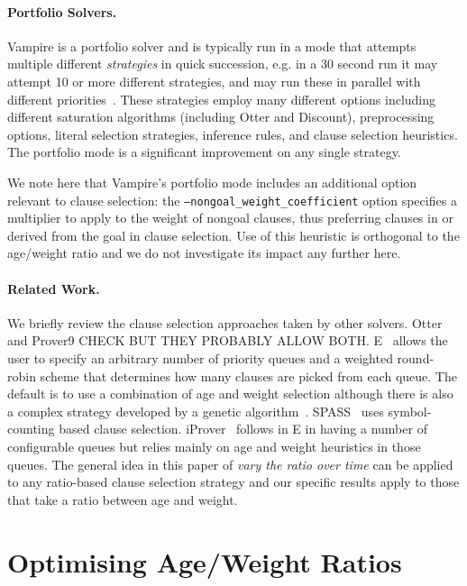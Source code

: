 \documentclass{llncs}
\begin{document}
\paragraph{Portfolio Solvers.}

Vampire is a portfolio solver and is typically run in a mode that attempts multiple different \emph{strategies} in quick succession, e.g. in a 30 second run it may attempt 10 or more different strategies, and may run these in parallel with different priorities~\cite{DBLP:conf/cade/RawsonR18}. These strategies employ many different options including different saturation algorithms (including Otter and Discount), preprocessing options, literal selection strategies, inference rules, and clause selection heuristics. The portfolio mode is a significant improvement on any single strategy. 

We note here that Vampire's portfolio mode includes an additional option relevant to clause selection: the \texttt{--nongoal\_weight\_coefficient} option specifies a multiplier to apply to the weight of nongoal clauses, thus preferring clauses in or derived from the goal in clause selection. Use of this heuristic is orthogonal to the age/weight ratio and we do not investigate its impact any further here.

\paragraph{Related Work.} We briefly review the clause selection approaches taken by other solvers. 
%
Otter \cite{} and Prover9 \cite{} CHECK BUT THEY PROBABLY  ALLOW BOTH.
%
E~\cite{E} allows the user to specify an arbitrary number of priority queues and a weighted round-robin scheme that determines how many clauses are picked from each queue. The default is to use a combination of age and weight selection although there is also a complex strategy developed by a genetic algorithm~\cite{DBLP:conf/gcai/SchaferS15}. 
%
SPASS~\cite{Spass} uses symbol-counting based clause selection. 
%
iProver~\cite{Iprover} follows in E in having a number of configurable queues but relies mainly on age and weight heuristics in those queues. 
%
The general idea in this paper of \emph{vary the ratio over time} can be applied to any ratio-based clause selection strategy and our specific results apply to those that take a ratio between age and weight.

\section{Optimising Age/Weight Ratios} \label{sec:awr:study}
\end{document}
